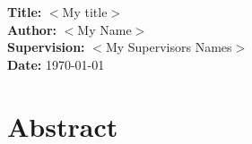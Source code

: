 \documentclass[11pt,a4paper]{article}
\newcommand{\dummy}[1]{$<$#1$>$}
\newcommand{\titles}[2]{\noindent\textbf{#1:} #2\\[2mm]}
\begin{document}
\titles{Title}{\dummy{My title}}
\titles{Author}{\dummy{My Name}}
\titles{Supervision}{\dummy{My Supervisors Names}}
\titles{Date}{\today}

\section*{Abstract}







\nocite{*}  %



\end{document}
